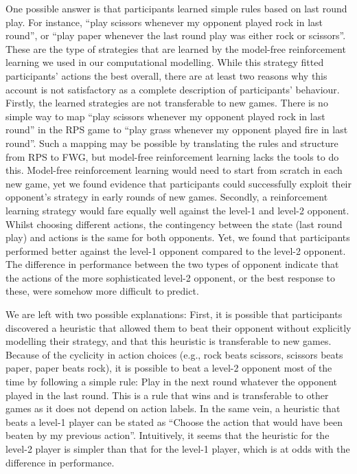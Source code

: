\documentclass[man,floatsintext]{apa6}
\begin{document}
One possible answer is that participants learned simple rules based on last round play. For instance, \enquote{play scissors whenever my opponent played rock in last round}, or \enquote{play paper whenever the last round play was either rock or scissors}. These are the type of strategies that are learned by the model-free reinforcement learning we used in our computational modelling. While this strategy fitted participants' actions the best overall, there are at least two reasons why this account is not satisfactory as a complete description of participants' behaviour. Firstly, the learned strategies are not transferable to new games. There is no simple way to map \enquote{play scissors whenever my opponent played rock in last round} in the RPS game to \enquote{play grass whenever my opponent played fire in last round}. Such a mapping may be possible by translating the rules and structure from RPS to FWG, but model-free reinforcement learning lacks the tools to do this. Model-free reinforcement learning would need to start from scratch in each new game, yet we found evidence that participants could successfully exploit their opponent's strategy in early rounds of new games. Secondly, a reinforcement learning strategy would fare equally well against the level-1 and level-2 opponent. Whilst choosing different actions, the contingency between the state (last round play) and actions is the same for both opponents. Yet, we found that participants performed better against the level-1 opponent compared to the level-2 opponent. The difference in performance between the two types of opponent indicate that the actions of the more sophisticated level-2 opponent, or the best response to these, were somehow more difficult to predict.

We are left with two possible explanations: First, it is possible that participants discovered a heuristic that allowed them to beat their opponent without explicitly modelling their strategy, and that this heuristic is transferable to new games. Because of the cyclicity in action choices (e.g., rock beats scissors, scissors beats paper, paper beats rock), it is possible to beat a level-2 opponent most of the time by following a simple rule: Play in the next round whatever the opponent played in the last round. This is a rule that wins and is transferable to other games as it does not depend on action labels. In the same vein, a heuristic that beats a level-1 player can be stated as \enquote{Choose the action that would have been beaten by my previous action}. Intuitively, it seems that the heuristic for the level-2 player is simpler than that for the level-1 player, which is at odds with the difference in performance.
\end{document}

